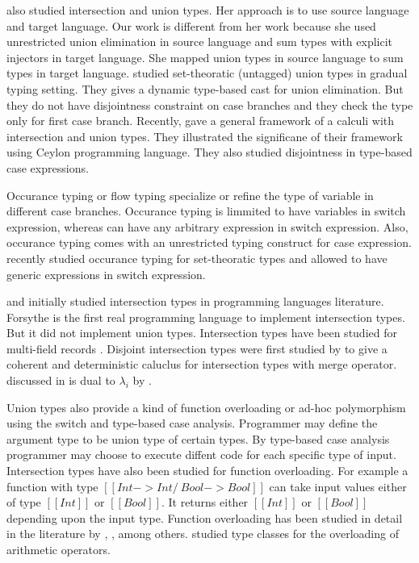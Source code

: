 \citet{dunfield2014elaborating} also studied intersection and union types. Her approach is to use source
language and target language. Our work is different from her work because she used unrestricted union
elimination in source language and sum types with explicit injectors in target language.
She mapped union types in source language to sum types in target language.
\citet{castagna2017gradual} studied set-theoratic (untagged) union types in gradual typing setting.
They gives a dynamic type-based cast for union elimination. But they do not have disjointness constraint
on case branches and they check the type only for first case branch.
Recently, \citet{muehlboeck2018empowering} gave a general framework of a calculi with intersection and 
union types. They illustrated the significane of their framework using Ceylon programming language.
They also studied disjointness in type-based case expressions.

Occurance typing or flow typing \citet{tobin2008design} specialize or refine the type of variable in different
case branches. Occurance typing is limmited to have variables in switch expression, whereas \cal
can have any arbitrary expression in switch expression. Also, occurance typing comes with an
unrestricted typing construct for case expression. \citet{castagna2019revisiting} recently studied
occurance typing for set-theoratic types and allowed to have generic expressions in switch expression.

\citet{pottinger1980type} and \citet{coppo1981functional} initially studied intersection types in 
programming languages literature. Forsythe \cite{reynolds1988preliminary} is the first 
real programming language to implement intersection types. But it did not implement union types.
Intersection types have been studied for
multi-field records \cite{}.
Disjoint intersection types were first studied by \citet{oliveira2016disjoint} to give a coherent
and deterministic caluclus for intersection types with merge operator. \cal discussed in 
is dual to $\lambda_{i}$ by \citet{oliveira2016disjoint}.

Union types also provide a kind of function overloading or ad-hoc polymorphism using the
switch and type-based case analysis. Programmer may define the argument type to be
union type of certain types. By type-based case analysis programmer may choose to execute
diffent code for each specific type of input.
Intersection types have also been studied for function overloading. For example a function with type
$[[Int -> Int /\ Bool -> Bool]]$ can take input values either of type $[[Int]]$ or $[[Bool]]$.
It returns either $[[Int]]$ or $[[Bool]]$ depending upon the input type.
Function overloading has been studied in detail in the literature by 
\cite{castagna1995calculus}, \cite{cardelli1985understanding}, \cite{stuckey2005theory} among others.
\citet{wadler1989make} studied type classes for the overloading of arithmetic operators.